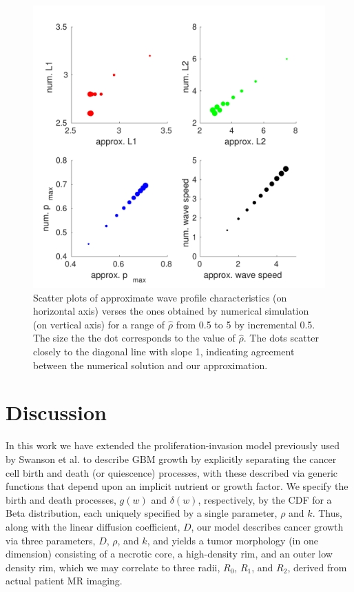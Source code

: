 \documentclass{aims}
\numberwithin{equation}{section}
\begin{document}
\begin{figure}
\begin{center}
\includegraphics[scale=0.67]{plots/scatterplot-new}
\end{center}


\caption{\label{fig:comparison-to-numerical}Scatter plots of approximate wave
profile characteristics (on horizontal axis) verses the ones obtained
by numerical simulation (on vertical axis) for a range of $\hat{\rho}$
from 0.5 to 5 by incremental 0.5. The size the the dot corresponds
to the value of $\hat{\rho}$. The dots scatter closely to the diagonal line with slope 1, indicating agreement between the numerical solution and our approximation.}
\end{figure}


\section{Discussion}

In this work we have extended the proliferation-invasion model previously used by Swanson et al. \cite{Swanson2008} to describe GBM growth by explicitly separating the cancer cell birth and death (or quiescence) processes, with these described via generic functions that depend upon an implicit nutrient or growth factor.  We specify the birth and death processes, $g(w)$ and $\delta(w)$, respectively, by the CDF for a Beta distribution, each uniquely specified by a single parameter, $\rho$ and $k$.  Thus, along with the linear diffusion coefficient, $D$, our model describes cancer growth via three parameters, $D$, $\rho$, and $k$, and yields a tumor morphology (in one dimension) consisting of a necrotic core, a high-density rim, and an outer low density rim, which we may correlate to three radii, $R_0$, $R_1$, and $R_2$, derived from actual patient MR imaging.
\end{document}
